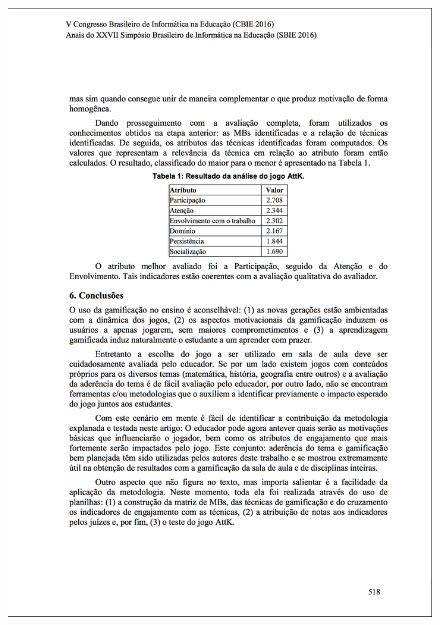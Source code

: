 \begin{apendicesenv}
\begin{figure}[h]
	\centering
		\includegraphics[keepaspectratio=true,scale=0.6]{figuras/a9.png}
\end{figure}


\end{apendicesenv}
